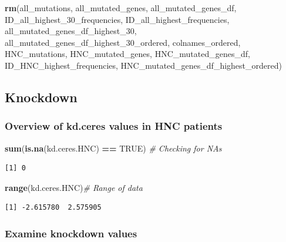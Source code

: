 \documentclass[]{article}
\newenvironment{Shaded}{\begin{snugshade}}{\end{snugshade}}
\newcommand{\KeywordTok}[1]{\textcolor[rgb]{0.13,0.29,0.53}{\textbf{#1}}}
\newcommand{\DecValTok}[1]{\textcolor[rgb]{0.00,0.00,0.81}{#1}}
\newcommand{\StringTok}[1]{\textcolor[rgb]{0.31,0.60,0.02}{#1}}
\newcommand{\CommentTok}[1]{\textcolor[rgb]{0.56,0.35,0.01}{\textit{#1}}}
\newcommand{\OtherTok}[1]{\textcolor[rgb]{0.56,0.35,0.01}{#1}}
\newcommand{\OperatorTok}[1]{\textcolor[rgb]{0.81,0.36,0.00}{\textbf{#1}}}
\newcommand{\NormalTok}[1]{#1}
\begin{document}
\begin{Shaded}
\begin{Highlighting}[]
\KeywordTok{rm}\NormalTok{(all_mutations, all_mutated_genes, all_mutated_genes_df, ID_all_highest_30_frequencies, ID_all_highest_frequencies, all_mutated_genes_df_highest_}\DecValTok{30}\NormalTok{, all_mutated_genes_df_highest_30_ordered, colnames_ordered, HNC_mutations, HNC_mutated_genes, HNC_mutated_genes_df, ID_HNC_highest_frequencies, HNC_mutated_genes_df_highest_ordered)}
\end{Highlighting}
\end{Shaded}

\subsection{Knockdown}\label{knockdown}

\subsubsection{Overview of kd.ceres values in HNC
patients}\label{overview-of-kd.ceres-values-in-hnc-patients}

\begin{Shaded}
\begin{Highlighting}[]
\KeywordTok{sum}\NormalTok{(}\KeywordTok{is.na}\NormalTok{(kd.ceres.HNC) }\OperatorTok{==}\StringTok{ }\OtherTok{TRUE}\NormalTok{) }\CommentTok{# Checking for NAs}
\end{Highlighting}
\end{Shaded}

\begin{verbatim}
[1] 0
\end{verbatim}

\begin{Shaded}
\begin{Highlighting}[]
\KeywordTok{range}\NormalTok{(kd.ceres.HNC)}\CommentTok{# Range of data}
\end{Highlighting}
\end{Shaded}

\begin{verbatim}
[1] -2.615780  2.575905
\end{verbatim}

\subsubsection{Examine knockdown values}\label{examine-knockdown-values}
\end{document}
